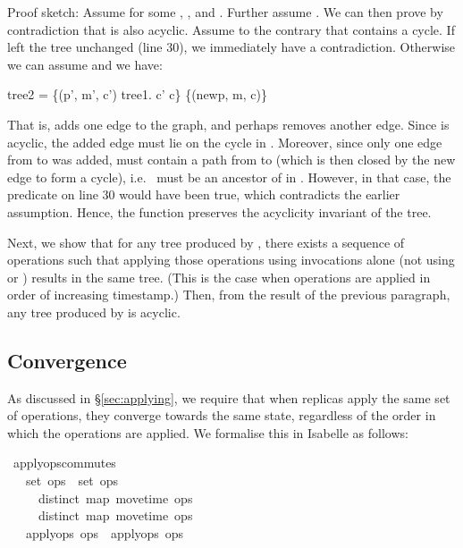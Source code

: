 \documentclass[sigplan,anonymous]{acmart}
\renewenvironment{isabelle}{%
  \medbreak\noindent%
  \renewcommand{\isanewline}{\\}%
  \begin{minipage}{\columnwidth}%
  \begin{isabellebody}%
  \begin{tabbing}%
}{%
  \end{tabbing}%
  \end{isabellebody}%
  \end{minipage}%
  \medbreak%
}
\renewcommand{\isacartoucheopen}{}
\renewcommand{\isacartoucheclose}{}
\begin{document}
Proof sketch: Assume  for some , ,  and .
Further assume .
We can then prove by contradiction that  is also acyclic.
Assume to the contrary that  contains a cycle.
If  left the tree unchanged (line 30), we immediately have a contradiction.
Otherwise we can assume  and we have:
\begin{isabelle}
tree2 = \{(p', m', c') {\isasymin} tree1. c' {\isasymnoteq} c\} {\isasymunion} \{(newp, m, c)\}
\end{isabelle}
That is,  adds one edge  to the graph, and perhaps removes another edge.
Since  is acyclic, the added edge must lie on the cycle in .
Moreover, since only one edge from  to  was added,  must contain a path from  to  (which is then closed by the new edge to form a cycle), i.e.\  must be an ancestor of  in .
However, in that case, the predicate  on line 30 would have been true, which contradicts the earlier assumption.
Hence, the  function preserves the acyclicity invariant of the tree.

Next, we show that for any tree produced by , there exists a sequence of operations such that applying those operations using  invocations alone (not using  or ) results in the same tree.
(This is the case when operations are applied in order of increasing timestamp.)
Then, from the result of the previous paragraph, any tree produced by  is acyclic.

\subsection{Convergence}\label{sec:convergence}

As discussed in \S\ref{sec:applying}, we require that when replicas apply the same set of operations, they converge towards the same state, regardless of the order in which the operations are applied.
We formalise this in Isabelle as follows:
\begin{isabelle}
\isamarkupfalse%
\ apply{\isacharunderscore}ops{\isacharunderscore}commutes{\isacharcolon}\isanewline
\ \ \ {\isacartoucheopen}set\ ops{}\ {\isacharequal}\ set\ ops{}{\isacartoucheclose}\isanewline
\ \ \ \ \ {\isacartoucheopen}distinct\ {\isacharparenleft}map\ move{\isacharunderscore}time\ ops{}{\isacharparenright}{\isacartoucheclose}\isanewline
\ \ \ \ \ {\isacartoucheopen}distinct\ {\isacharparenleft}map\ move{\isacharunderscore}time\ ops{}{\isacharparenright}{\isacartoucheclose}\isanewline
\ \ \ {\isacartoucheopen}apply{\isacharunderscore}ops\ ops{}\ {\isacharequal}\ apply{\isacharunderscore}ops\ ops{}{\isacartoucheclose}
\end{isabelle}
\end{document}
